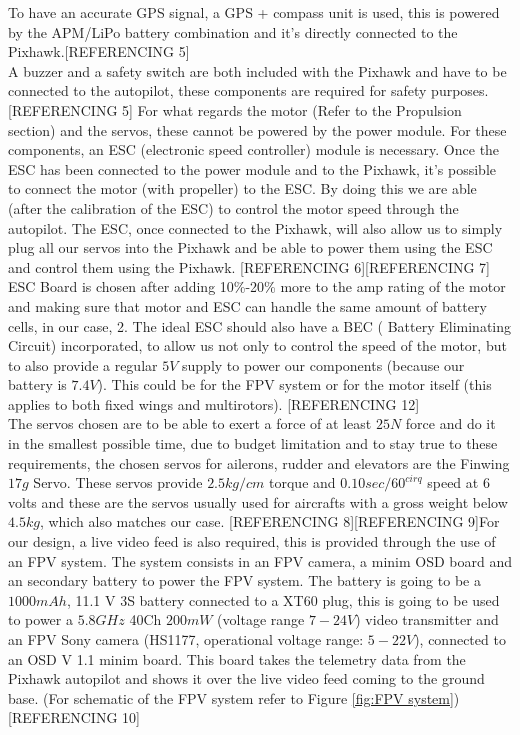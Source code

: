 \documentclass[12pt]{article}
\begin{document}
\noindent To have an accurate GPS signal, a GPS + compass unit is used, this is powered by the APM/LiPo battery combination and it's directly connected to the Pixhawk.[REFERENCING 5] \\

\noindent A buzzer and a safety switch are both included with the Pixhawk and have to be connected to the autopilot, these components are required for safety purposes.[REFERENCING 5] For what regards the motor (Refer to the Propulsion section) and the servos, these cannot be powered by the power module. For these components, an ESC (electronic speed controller) module is necessary. Once the ESC has been connected to the power module and to the Pixhawk, it's possible to connect the motor (with propeller) to the ESC. By doing this we are able (after the calibration of the ESC) to control the motor speed through the autopilot. The ESC, once connected to the Pixhawk, will also allow us to simply plug all our servos into the Pixhawk and be able to power them using the ESC and control them using the Pixhawk. [REFERENCING 6][REFERENCING 7] ESC Board is chosen after adding 10\%-20\% more to the amp rating of the motor and making sure that motor and ESC can handle the same amount of battery cells, in our case, 2. The ideal ESC should also have a BEC ( Battery Eliminating Circuit) incorporated, to allow us not only to control the speed of the motor, but to also provide a regular $5V$  supply to power our components (because our battery is $7.4V$). This could be for the FPV system or for the motor itself (this applies to both fixed wings and multirotors). [REFERENCING 12]\\

\noindent The servos chosen are to be able to exert a force of at least $25N$ force and do it in the smallest possible time, due to budget limitation and to stay true to these requirements, the chosen servos for ailerons, rudder and elevators are the Finwing $17g$ Servo. These servos provide $2.5kg/cm$ torque and $0.10sec/60^{cirq}$ speed at 6 volts and  these are the servos usually used for aircrafts with a gross weight below $4.5kg$, which also matches our case. [REFERENCING 8][REFERENCING 9]For our design, a live video feed is also required, this is provided through the use of an FPV system. The system consists in an FPV camera, a minim OSD board and an secondary battery to power the FPV system. The battery is going to be a $1000mAh$, 11.1 V 3S battery connected to a XT60 plug, this is going to be used to power a $5.8GHz$ 40Ch $200mW$ (voltage range $7 - 24V$) video transmitter and an FPV Sony camera (HS1177, operational voltage range: $5 - 22V$), connected to an OSD V 1.1 minim board. This board takes the telemetry data from the Pixhawk autopilot and shows it over the live video feed coming to the ground base. (For schematic of the FPV system refer to Figure \ref{fig:FPV system})[REFERENCING 10] \\
\end{document}
